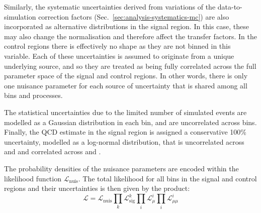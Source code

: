 Similarly, the systematic uncertainties derived from variations of the 
data-to-simulation correction factors (Sec.~\ref{sec:analysis-systematics-mc}) 
are also incorporated as alternative \mht distributions in the signal region. 
In this case, these may also change the \mht normalisation and therefore affect 
the transfer factors. In the control regions there is effectively no \mht shape 
as they are not binned in this variable.
Each of these uncertainties is assumed to originate from a unique 
underlying source, and so they are treated as being fully correlated across the 
full parameter space of the signal and control regions. In other words, there 
is only one nuisance parameter for each source of uncertainty that is shared 
among all bins and processes.

The statistical uncertainties due to the limited number of simulated events are 
modelled as a Gaussian distribution in each bin, and are uncorrelated across 
bins. Finally, the QCD estimate in the signal region is assigned a conservative 
100\% uncertainty, modelled as a log-normal distribution, that is uncorrelated 
across \njet and \scalht and correlated across \nb and \mht.

The probability densities of the nuisance parameters %
are encoded within the likelihood function $\mathcal{L}_\mathrm{nuis}$.
The total likelihood for all bins in the signal and control regions and their 
uncertainties is then given by the product:
\begin{equation}
\mathcal{L} = \mathcal{L}_\mathrm{nuis} \prod_k \mathcal{L}_\mathrm{sig}^k 
\prod_i \mathcal{L}_{\mu}^i \prod_i \mathcal{L}_{\mu\mu}^i
\end{equation}




